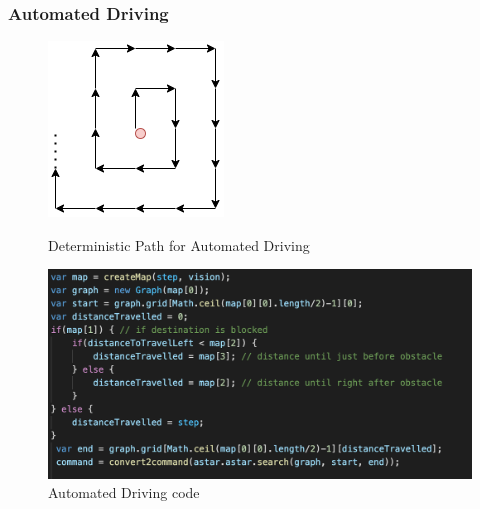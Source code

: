 \documentclass[a4paper]{article}
\begin{document}
\subsubsection{Automated Driving}

\begin{figure}[H]
    \centering
    \begin{minipage}{.3\textwidth}
      \centering
      \includegraphics[width = 0.7\linewidth]{./images/DeterministicPath.png}
		\caption{Deterministic Path for Automated Driving}
        \label{fig:deterministicpath}
    \end{minipage}\hfill
    \begin{minipage}{.7\textwidth}
      \centering
      \includegraphics[width = 0.7\linewidth]{./images/AutomatedDriving.png}
		\caption{Automated Driving code}
        \label{fig:automateddriving}
    \end{minipage}
\end{figure}
\end{document}
